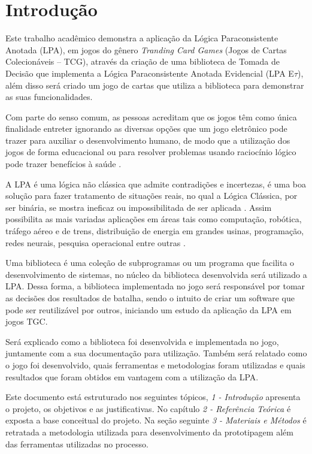 
\chapter{Introdução}

Este trabalho acadêmico demonstra a aplicação da Lógica Paraconsistente Anotada (LPA), em jogos do gênero \textit{Tranding Card Games} (Jogos de Cartas Colecionáveis – TCG), através da criação de uma biblioteca de Tomada de Decisão que implementa a Lógica Paraconsistente Anotada Evidencial (LPA E$\tau$), além disso será criado um jogo de cartas que utiliza a biblioteca para demonstrar as suas funcionalidades.

Com parte do senso comum, as pessoas acreditam que os jogos têm como única finalidade entreter ignorando as diversas opções que um jogo eletrônico pode trazer para auxiliar o desenvolvimento humano, de modo que a utilização dos jogos de forma educacional ou para resolver problemas usando raciocínio lógico pode trazer benefícios à saúde \cite{fabio-luis-lpa}.

A LPA é uma lógica não clássica que admite contradições e incertezas, é uma boa solução para fazer tratamento de situações reais, no qual a Lógica Clássica, por ser binária, se mostra ineficaz ou impossibilitada de ser aplicada \cite{metodos-lpa-2006}. Assim possibilita as mais variadas aplicações em áreas tais como computação, robótica, tráfego aéreo e de trens, distribuição de energia em grandes usinas, programação, redes neurais, pesquisa operacional entre outras \cite{tomda-decisao-lpa-2011}.

Uma biblioteca é uma coleção de subprogramas ou um programa que facilita o desenvolvimento de sistemas, no núcleo da biblioteca desenvolvida será utilizado a
LPA. Dessa forma, a biblioteca implementada no jogo será responsável por tomar as decisões dos resultados de batalha, sendo o intuito de criar um software que pode ser reutilizável por outros, iniciando um estudo da aplicação da LPA em jogos TGC.

Será explicado como a biblioteca foi desenvolvida e implementada no jogo, juntamente com a sua documentação para utilização. Também será relatado como o
jogo foi desenvolvido, quais ferramentas e metodologias foram utilizadas e quais resultados que foram obtidos em vantagem com a utilização da LPA.

Este documento está estruturado nos seguintes tópicos, \textit{1 - Introdução} apresenta o projeto, os objetivos e as justificativas. No capítulo \textit{2 - Referência Teórica} é
exposta a base conceitual do projeto. Na seção seguinte \textit{3 - Materiais e Métodos} é retratada a metodologia utilizada para desenvolvimento da prototipagem além das ferramentas utilizadas no processo.

